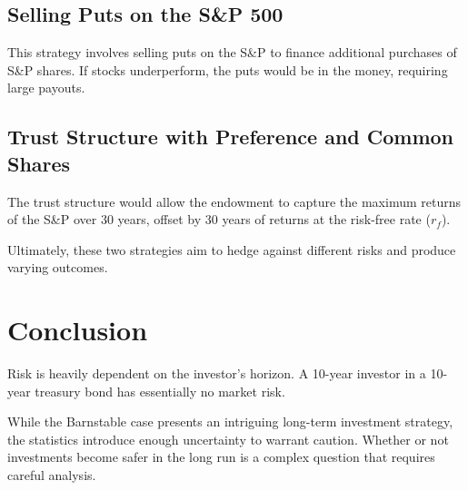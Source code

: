 \documentclass{article}
\begin{document}
\subsection{Selling Puts on the S\&P 500}
This strategy involves selling puts on the S\&P to finance additional purchases of S\&P shares. If stocks underperform, the puts would be in the money, requiring large payouts.

\subsection{Trust Structure with Preference and Common Shares}
The trust structure would allow the endowment to capture the maximum returns of the S\&P over 30 years, offset by 30 years of returns at the risk-free rate ($r_f$).

Ultimately, these two strategies aim to hedge against different risks and produce varying outcomes.

\section{Conclusion}
Risk is heavily dependent on the investor's horizon. A 10-year investor in a 10-year treasury bond has essentially no market risk.

While the Barnstable case presents an intriguing long-term investment strategy, the statistics introduce enough uncertainty to warrant caution. Whether or not investments become safer in the long run is a complex question that requires careful analysis.
\end{document}
